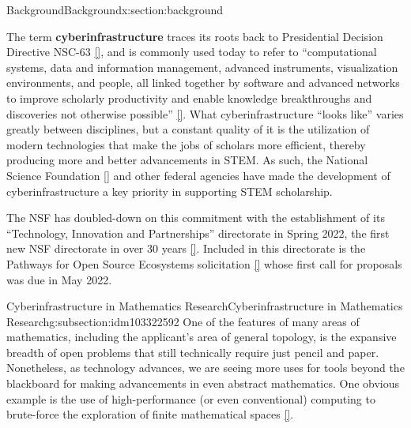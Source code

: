 \documentclass[oneside,10pt,]{article}
\newcommand{\xreffont}{\relax}
\newcommand{\terminology}[1]{\textbf{#1}}
\begin{document}
\begin{sectionptx}{Background}{}{Background}{}{}{x:section:background}
\begin{introduction}{}%
The term \terminology{cyberinfrastructure} traces its roots back to Presidential Decision Directive NSC-63 \hyperlink{x:biblio:biblio-prez}{[{\xreffont 27}]}, and is commonly used today to refer to ``computational systems, data and information management, advanced instruments, visualization environments, and people, all linked together by software and advanced networks to improve scholarly productivity and enable knowledge breakthroughs and discoveries not otherwise possible'' \hyperlink{x:biblio:biblio-cyber-educause}{[{\xreffont 14}]}. What cyberinfrastructure ``looks like'' varies greatly between disciplines, but a constant quality of it is the utilization of modern technologies that make the jobs of scholars more efficient, thereby producing more and better advancements in STEM. As such, the National Science Foundation \hyperlink{x:biblio:biblio-cyber-nsf}{[{\xreffont 20}]} and other federal agencies have made the development of cyberinfrastructure a key priority in supporting STEM scholarship.%
\par
The NSF has doubled-down on this commitment with the establishment of its ``Technology, Innovation and Partnerships'' directorate in Spring 2022, the first new NSF directorate in over 30 years \hyperlink{x:biblio:biblio-tip-announce}{[{\xreffont 24}]}. Included in this directorate is the Pathways for Open Source Ecosystems solicitation \hyperlink{x:biblio:biblio-pose}{[{\xreffont 22}]} whose first call for proposals was due in May 2022.%
\end{introduction}%
%
%
\typeout{************************************************}
\typeout{************************************************}
%
\begin{subsectionptx}{Cyberinfrastructure in Mathematics Research}{}{Cyberinfrastructure in Mathematics Research}{}{}{g:subsection:idm103322592}
One of the features of many areas of mathematics, including the applicant's area of general topology, is the expansive breadth of open problems that still technically require just pencil and paper. Nonetheless, as technology advances, we are seeing more uses for tools beyond the blackboard for making advancements in even abstract mathematics. One obvious example is the use of high-performance (or even conventional) computing to brute-force the exploration of finite mathematical spaces \hyperlink{x:biblio:biblio-high-compute}{[{\xreffont 4}]}.%

\end{subsectionptx}
\end{sectionptx}
\end{document}
